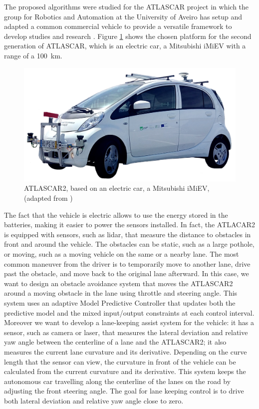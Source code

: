 \documentclass[conference,11pt]{IEEEtran}
\begin{document}
The proposed algorithms were studied for the ATLASCAR project in which the group for Robotics and Automation at the University of Aveiro has setup and adapted a common commercial vehicle to provide a versatile  framework  to  develop  studies  and  research %
\cite{atlascar1} \cite{atlascar2}.
Figure \ref{fig:atlascar2} shows the chosen platform for the second generation of ATLASCAR, which is an electric car, a Mitsubishi iMiEV with a range of a \SI{100}{km}.
\begin{figure}[!h]
	\centering
	\includegraphics[width=0.6\columnwidth]{./figure/atlascar2.jpg}
	\caption{ATLASCAR2, based on an electric car, a Mitsubishi iMiEV, (adapted from \protect\cite{ricardo}) }
	\label{fig:atlascar2}
\end{figure}

The fact that the vehicle is electric allows to use the energy stored in the batteries, making it easier to power the sensors installed. In fact, the ATLACAR2 is equipped with sensors, such as lidar, that measure the distance to obstacles in front and around the vehicle. The obstacles can be static, such as a large pothole, or moving, such as a moving vehicle on the same or a nearby lane. The most common maneuver from the driver is to temporarily move to another lane, drive past the obstacle, and move back to the original lane afterward. In this case, we want to design an obstacle avoidance system that moves the ATLASCAR2 around a moving obstacle in the lane using throttle and steering angle. This system uses an adaptive Model Predictive Controller that updates both the predictive model and the mixed input/output constraints at each control interval. Moreover we want to develop a lane-keeping assist system for the vehicle: it has a sensor, such as camera or laser, that measures the lateral deviation and relative yaw angle between the centerline of a lane and the ATLASCAR2; it also measures the current lane curvature and its derivative. Depending on the curve length that the sensor can view, the curvature in front of the vehicle can be calculated from the current curvature and its derivative. This system keeps the autonomous car travelling along the centerline of the lanes on the road by adjusting the front steering angle. The goal for lane keeping control is to drive both lateral deviation and relative yaw angle close to zero.
\end{document}
